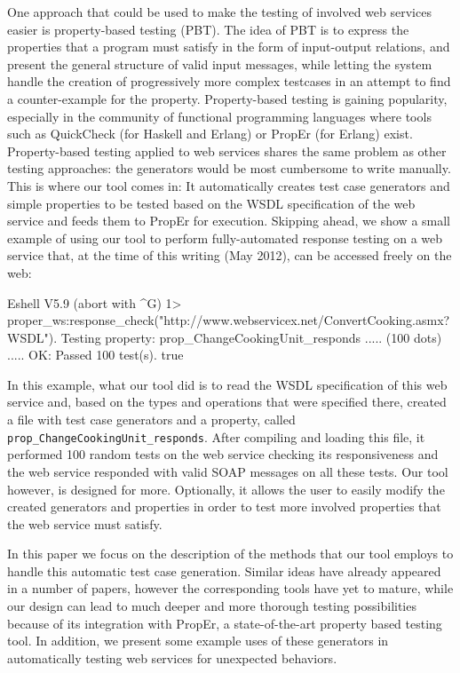 \documentclass[submission,copyright]{eptcs}
\begin{document}
One approach that could be used to make the testing of involved web
services easier is property-based testing (PBT). The idea of PBT is to
express the properties that a program must satisfy in the form of
input-output relations, and present the general structure of valid
input messages, while letting the system handle the creation of
progressively more complex testcases in an attempt to find a
counter-example for the property. Property-based testing is gaining
popularity, especially in the community of functional programming
languages where tools such as QuickCheck (for Haskell and Erlang) or
PropEr (for Erlang) exist.
%
Property-based testing applied to web services shares the same problem
as other testing approaches: the generators would be most cumbersome
to write manually. This is where our tool comes in: It automatically
creates test case generators and simple properties to be tested based
on the WSDL specification of the web service and feeds them to PropEr
for execution.
%
Skipping ahead, we show a small example of using our tool to perform
fully-automated response testing on a web service that, at the time of
this writing (May 2012), can be accessed freely on the web:

\begin{lstoutput}
Eshell V5.9 (abort with ^G)
1> proper_ws:response_check("http://www.webservicex.net/ConvertCooking.asmx?WSDL").
Testing property: prop_ChangeCookingUnit_responds
..... (100 dots) .....
OK: Passed 100 test(s).
true
\end{lstoutput}

In this example, what our tool did is to read the WSDL specification
of this web service and, based on the types and operations that were
specified there, created a file with test case generators and a
property, called \texttt{prop\_ChangeCookingUnit\_responds}. After
compiling and loading this file, it performed 100 random tests on the
web service checking its responsiveness and the web service responded
with valid SOAP messages on all these tests. Our tool however, is
designed for more. Optionally, it allows the user to easily modify the
created generators and properties in order to test more involved
properties that the web service must satisfy.


In this paper we focus on the description of the methods that our tool
employs to handle this automatic test case generation. Similar ideas
have already appeared in a number of papers, however the corresponding
tools have yet to mature, while our design can lead to much deeper and
more thorough testing possibilities because of its integration with
PropEr, a state-of-the-art property based testing tool. In addition,
we present some example uses of these generators in automatically
testing web services for unexpected behaviors.
\end{document}
